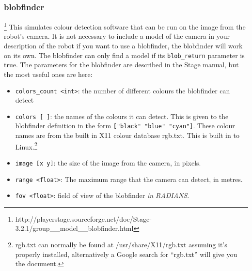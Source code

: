 \documentclass[a4paper]{report}
\begin{document}
\subsubsection{blobfinder}\footnote{http://playerstage.sourceforge.net/doc/Stage-3.2.1/group\_\_model\_\_blobfinder.html}
This simulates colour detection software that can be run on the image from the robot's camera. It is not necessary to include a model of the camera in your description of the robot if you want to use a blobfinder, the blobfinder will work on its own. The blobfinder can only find a model if its \verb|blob_return| parameter is true. The parameters for the blobfinder are described in the Stage manual, but the most useful ones are here:
\begin{itemize}
\item \verb|colors_count <int>|: the number of different colours the blobfinder can detect
\item \verb|colors [ ]|: the names of the colours it can detect. This is given to the blobfinder definition in the form \verb|["black" "blue" "cyan"]|. These colour names are from the built in X11 colour database rgb.txt. This is built in to Linux.\footnote{rgb.txt can normally be found at /usr/share/X11/rgb.txt assuming it's properly installed, alternatively a Google search for ``rgb.txt'' will give you the document.}
\item \verb|image [x y]|: the size of the image from the camera, in pixels.
\item \verb|range <float>|: The maximum range that the camera can detect, in metres.
\item \verb|fov <float>|: field of view of the blobfinder \emph{in RADIANS}.
\end{itemize}
\end{document}
